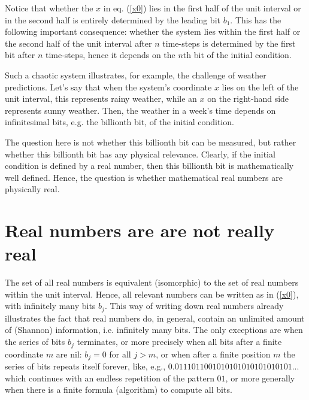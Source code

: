 \documentclass[pra,aps,groupedaddress,twocolumn,floatfix,nofootinbib]{revtex4}
\begin{document}
Notice that whether the $x$ in eq. (\ref{x0}) lies in the first half of the unit interval or in the second half is entirely determined by the leading bit $b_1$. This has the following important consequence: whether the system lies within the first half or the second half of the unit interval after $n$ time-steps is determined by the first bit after $n$ time-steps, hence it depends on the $n$th bit of the initial condition.

Such a chaotic system illustrates, for example, the challenge of weather predictions. Let's say that when the system's coordinate $x$ lies on the left of the unit interval, this represents rainy weather, while an $x$ on the right-hand side represents sunny weather. Then, the weather in a week's time depends on infinitesimal bits, e.g. the billionth bit, of the initial condition.

The question here is not whether this billionth bit can be measured, but rather whether this billionth bit has any physical relevance. Clearly, if the initial condition is defined by a real number, then this billionth bit is mathematically well defined. Hence, the question is whether mathematical real numbers are physically real.


\section{Real numbers are are not really real}\label{realNb}
The set of all real numbers is equivalent (isomorphic) to the set of real numbers within the unit interval. Hence, all relevant numbers can be written as in (\ref{x0}), with infinitely many bits $b_j$. This way of writing down real numbers already illustrates the fact that real numbers do, in general, contain an unlimited amount of (Shannon) information, i.e. infinitely many bits. The only exceptions are when the series of bits $b_j$ terminates, or more precisely when all bits after a finite coordinate $m$ are nil: $b_j=0$ for all $j>m$, or when after a finite position $m$ the series of bits repeats itself forever, like, e.g., $0.0111011001010101010101010101...$ which continues with an endless repetition of the pattern $01$, or more generally when there is a finite formula (algorithm) to compute all bits.
\end{document}
